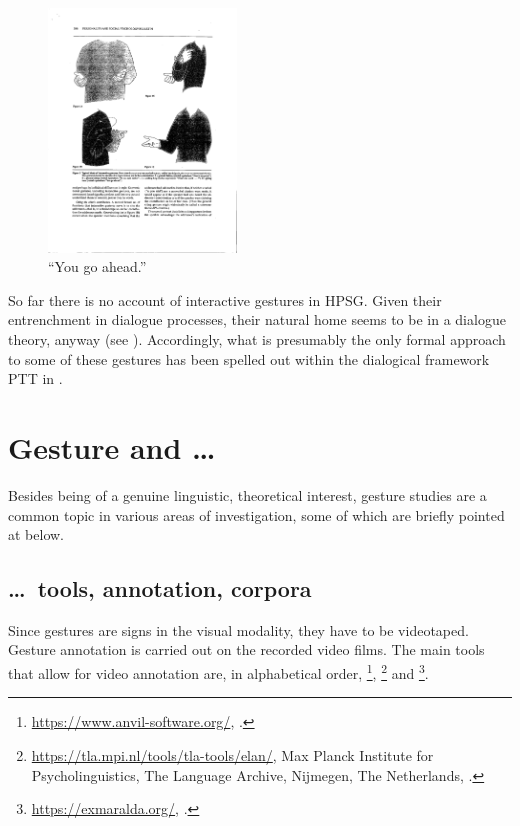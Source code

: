 \documentclass[output=paper]{langsci/langscibook}
\begin{document}
\begin{figure}
  \centering
  \includegraphics[trim={11cm 4cm 13cm 10.5cm}, clip, angle=90, width=5cm]{figures/InteractiveGestures}
\caption{\enquote{You go ahead.}}
\label{fig:yourturn}
\end{figure}

So far there is no account of interactive gestures in HPSG. 
%
Given their entrenchment in dialogue processes, their natural home seems to be in a dialogue theory, anyway (see ).
%
Accordingly, what is presumably the only formal approach to some of these gestures has been spelled out within the dialogical framework PTT in \citet{Rieser:Poesio:2009}.




\section{Gesture and \ldots}
\label{sec:gesture-and}

Besides being of a genuine linguistic, theoretical interest, gesture studies are a common topic in various areas of investigation, some of which are briefly pointed at below. 


\subsection{\ldots\ tools, annotation, corpora}
\label{sec:tools-annotation-corpora}

Since gestures are signs in the visual modality, they have to be videotaped.
%
Gesture annotation is carried out on the recorded video films.
%
The main tools that allow for video annotation are, in alphabetical order, \footnote{%
\url{https://www.anvil-software.org/}, \citealp{Kipp:2014}.
}, \footnote{%
\url{https://tla.mpi.nl/tools/tla-tools/elan/}, Max Planck Institute for Psycholinguistics, The
Language Archive, Nijmegen, The Netherlands, \citealp{Sloetjes:Wittenburg:2008}.}
and \footnote{%
\url{https://exmaralda.org/}, \citealp{Schmidt:2012}.
}.
\end{document}
